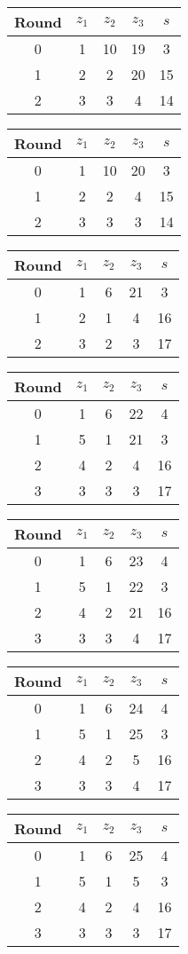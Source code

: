 \begin{multicols}{2}
\begin{tabular}{c | c | c | c | c }
Round & $z_1$ & $z_2$ & $z_3$ & $s$ \\
\hline
0 & 1 & 10 & 19 & 3 \\
1 & 2 & 2 & 20 & 15 \\
2 & 3 & 3 & 4 & 14
\end{tabular}


\begin{tabular}{c | c | c | c | c }
Round & $z_1$ & $z_2$ & $z_3$ & $s$ \\
\hline
0 & 1 & 10 & 20 & 3 \\
1 & 2 & 2 & 4 & 15 \\
2 & 3 & 3 & 3 & 14
\end{tabular}


\begin{tabular}{c | c | c | c | c }
Round & $z_1$ & $z_2$ & $z_3$ & $s$ \\
\hline
0 & 1 & 6 & 21 & 3 \\
1 & 2 & 1 & 4 & 16 \\
2 & 3 & 2 & 3 & 17
\end{tabular}


\begin{tabular}{c | c | c | c | c }
Round & $z_1$ & $z_2$ & $z_3$ & $s$ \\
\hline
0 & 1 & 6 & 22 & 4 \\
1 & 5 & 1 & 21 & 3 \\
2 & 4 & 2 & 4 & 16 \\
3 & 3 & 3 & 3 & 17
\end{tabular}


\begin{tabular}{c | c | c | c | c }
Round & $z_1$ & $z_2$ & $z_3$ & $s$ \\
\hline
0 & 1 & 6 & 23 & 4 \\
1 & 5 & 1 & 22 & 3 \\
2 & 4 & 2 & 21 & 16 \\
3 & 3 & 3 & 4 & 17
\end{tabular}


\begin{tabular}{c | c | c | c | c }
Round & $z_1$ & $z_2$ & $z_3$ & $s$ \\
\hline
0 & 1 & 6 & 24 & 4 \\
1 & 5 & 1 & 25 & 3 \\
2 & 4 & 2 & 5 & 16 \\
3 & 3 & 3 & 4 & 17
\end{tabular}


\begin{tabular}{c | c | c | c | c }
Round & $z_1$ & $z_2$ & $z_3$ & $s$ \\
\hline
0 & 1 & 6 & 25 & 4 \\
1 & 5 & 1 & 5 & 3 \\
2 & 4 & 2 & 4 & 16 \\
3 & 3 & 3 & 3 & 17
\end{tabular}



\end{multicols}
